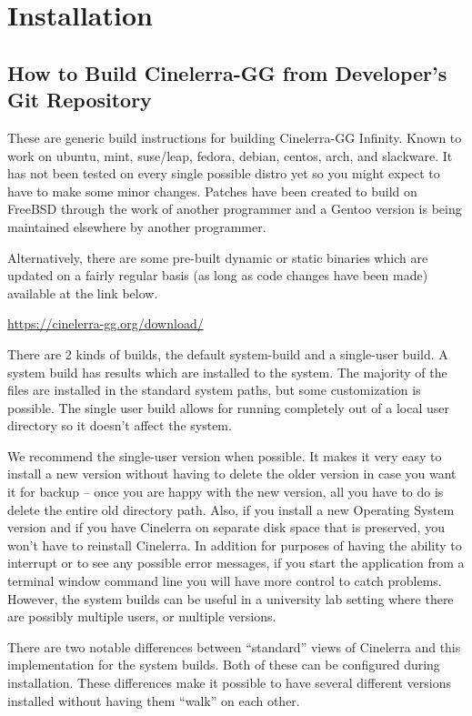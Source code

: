 \chapter{Installation}
\label{cha:Instalation}
\section{How to Build Cinelerra-GG from Developer's Git Repository}%
\label{sec:How_to_build}

These are generic build instructions for building Cinelerra-GG Infinity.  
Known to work on ubuntu, mint, suse/leap, fedora, debian, centos, arch, and slackware.  
It has not been tested on every single possible distro yet so you might expect to have to make some minor changes.  
Patches have been created to build on FreeBSD through the work of another programmer and a Gentoo version is being maintained elsewhere by another programmer.

Alternatively, there are some pre-built dynamic or static binaries which are updated on a fairly regular basis (as long as code changes have been made) available at the link below.


\url{
https://cinelerra-gg.org/download/
}

There are 2 kinds of builds, the default system-build and a single-user build.  
A system build has results which are installed to the system. 
The majority of the files are installed in the standard system paths, but some customization is possible. 
The single user build allows for running completely out of a local user directory so it doesn't affect the system.

We recommend the single-user version when possible.  
It makes it very easy to install a new version without having to delete the older version in case you want it for backup – once you are happy with the new version, all you have to do is delete the entire old directory path.  
Also, if you install a new Operating System version and if you have Cinelerra on separate disk space that is preserved, you won't have to reinstall Cinelerra.  
In addition for purposes of having the ability to interrupt or to see any possible error messages, if you start the application from a terminal window command line you will have more control to catch problems.  
However, the system builds can be useful in a university lab setting where there are possibly multiple users, or multiple versions.

There are two notable differences between “standard” views of Cinelerra and this implementation for the system builds.  
Both of these can be configured during installation.  
These differences make it possible to have several different versions installed without having them “walk” on each other. 









